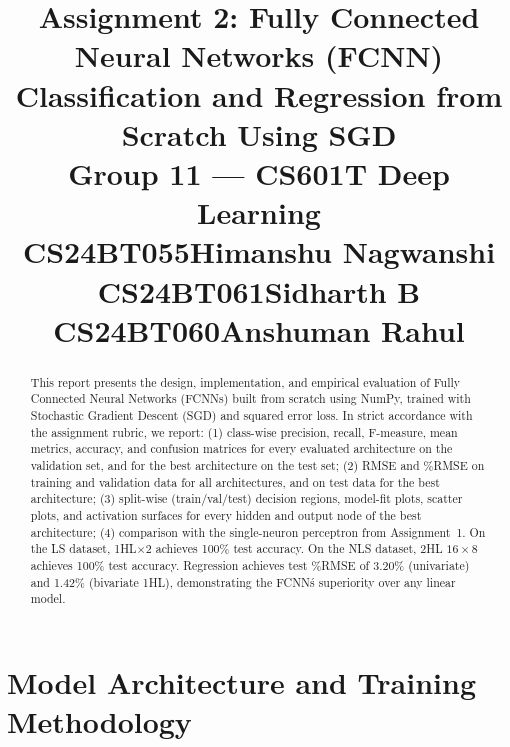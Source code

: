 \documentclass[11pt,a4paper]{article}
\title{\textbf{Assignment 2: Fully Connected Neural Networks (FCNN)}\\[1em]
\large Classification and Regression from Scratch Using SGD\\[2em]
\normalsize\textbf{Group 11} --- CS601T Deep Learning\\[1.5em]
\normalsize
CS24BT055\enspace Himanshu Nagwanshi\\
CS24BT061\enspace Sidharth B\\
CS24BT060\enspace Anshuman Rahul}
\author{}
\date{}
\begin{document}
\maketitle
\thispagestyle{empty}

\begin{abstract}
This report presents the design, implementation, and empirical evaluation of Fully Connected Neural Networks (FCNNs) built from scratch using NumPy, trained with Stochastic Gradient Descent (SGD) and squared error loss. In strict accordance with the assignment rubric, we report: (1) class-wise precision, recall, F-measure, mean metrics, accuracy, and confusion matrices for every evaluated architecture on the validation set, and for the best architecture on the test set; (2) RMSE and \%RMSE on training and validation data for all architectures, and on test data for the best architecture; (3) split-wise (train/val/test) decision regions, model-fit plots, scatter plots, and activation surfaces for every hidden and output node of the best architecture; (4) comparison with the single-neuron perceptron from Assignment~1. On the LS dataset, 1HL$\times$2 achieves 100\% test accuracy. On the NLS dataset, 2HL $16\times8$ achieves 100\% test accuracy. Regression achieves test \%RMSE of 3.20\% (univariate) and 1.42\% (bivariate 1HL), demonstrating the FCNN\'s superiority over any linear model.
\end{abstract}

\tableofcontents
\newpage

\section{Model Architecture and Training Methodology}
\end{document}
